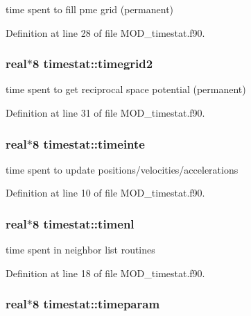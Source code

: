 time spent to fill pme grid (permanent) 



Definition at line 28 of file M\-O\-D\-\_\-timestat.\-f90.

\hypertarget{classtimestat_a3ae3541e8b68065f98087c4f8a03c2bb}{
\subsubsection[{timegrid2}]{\setlength{\rightskip}{0pt plus 5cm}real$\ast$8 timestat\-::timegrid2}}\label{classtimestat_a3ae3541e8b68065f98087c4f8a03c2bb}


time spent to get reciprocal space potential (permanent) 



Definition at line 31 of file M\-O\-D\-\_\-timestat.\-f90.

\hypertarget{classtimestat_a6ee83b4d368fd59cababfaabc46c0e20}{
\subsubsection[{timeinte}]{\setlength{\rightskip}{0pt plus 5cm}real$\ast$8 timestat\-::timeinte}}\label{classtimestat_a6ee83b4d368fd59cababfaabc46c0e20}


time spent to update positions/velocities/accelerations 



Definition at line 10 of file M\-O\-D\-\_\-timestat.\-f90.

\hypertarget{classtimestat_a4d04195176078e0328c8005fe8356a7b}{
\subsubsection[{timenl}]{\setlength{\rightskip}{0pt plus 5cm}real$\ast$8 timestat\-::timenl}}\label{classtimestat_a4d04195176078e0328c8005fe8356a7b}


time spent in neighbor list routines 



Definition at line 18 of file M\-O\-D\-\_\-timestat.\-f90.

\hypertarget{classtimestat_aad771aed865444d4520ba31e4986427c}{
\subsubsection[{timeparam}]{\setlength{\rightskip}{0pt plus 5cm}real$\ast$8 timestat\-::timeparam}}\label{classtimestat_aad771aed865444d4520ba31e4986427c}



